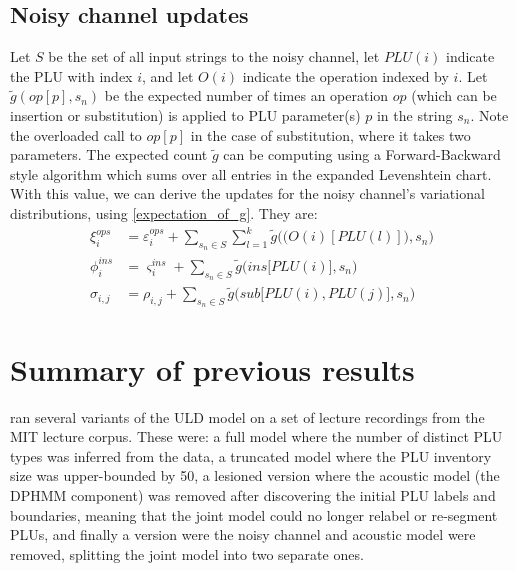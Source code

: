 \documentclass[12pt,letterpaper]{article}
\begin{document}
\subsection{Noisy channel updates}
Let $S$ be the set of all input strings to the noisy channel, let $PLU(i)$ indicate the PLU with index $i$, and let $O(i)$ indicate the operation indexed by $i$. Let $\tilde g(op[p], s_n)$ be the expected number of times an operation $op$ (which can be insertion or substitution) is applied to PLU parameter(s) $p$ in the string $s_n$. Note the overloaded call to $op[p]$ in the case of substitution, where it takes two parameters. The expected count $\tilde g$ can be computing using a Forward-Backward style algorithm which sums over all entries in the expanded Levenshtein chart. With this value, we can derive the updates for the noisy channel's variational distributions, using \eqref{expectation_of_g}. They are:
\begin{align*}
\nonumber \xi^{ops}_i &= \varepsilon^{ops}_i + \sum\limits_{s_n \in S}\sum\limits_{l = 1}^k \tilde g\Big(\big( O(i)[PLU(l)]\big), s_n\Big) \\
\nonumber \phi^{ins}_i &= \varsigma^{ins}_i + \sum\limits_{s_n \in S} \tilde g\Big(ins\big[PLU(i)\big], s_n\Big)\\
\nonumber \sigma_{i,j} &= \rho_{i,j} + \sum\limits_{s_n \in S} \tilde g\Big(sub\big[PLU(i), PLU(j)\big], s_n\Big)
\end{align*}

\section{Summary of previous results}
\citet{lee:2015} ran several variants of the ULD model on a set of lecture recordings from the MIT lecture corpus. These were: a full model where the number of distinct PLU types was inferred from the data, a truncated model where the PLU inventory size was upper-bounded by 50, a lesioned version where the acoustic model (the DPHMM component) was removed after discovering the initial PLU labels and boundaries, meaning that the joint model could no longer relabel or re-segment PLUs, and finally a version were the noisy channel and acoustic model were removed, splitting the joint model into two separate ones. 
\end{document}
